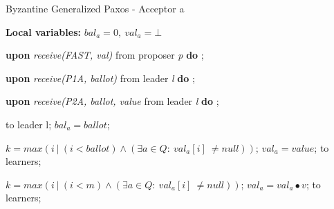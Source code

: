 \begin{algorithm}
\begin{algorithmic}[1]
		\iffalse \State
		\Function{proved\_safe}{Q, m}
		\State $k = max(i\ |\ (i < m) \wedge (\exists a \in Q :\ val_a[i]\ \neq null))$;
		\State $RS = \{R \in k$-$quorum\ |\ \forall a \in R \cap Q : val_a[k] \neq null\}$;
		\State $\gamma(R) = \sqcap \{v_a[k]\ |\ a \in Q \cap R \}$;
		\State $\Gamma = \{\gamma(R)\ |\ R \in RS \}$;
		\State
		\If{$RS = \varnothing$}
		\State \textbf{return} $\{val_a[k]\ |\ (a \in Q) \wedge (val_a[k] \neq null)\}$;
		\Else
		\State \textbf{return} $\sqcup \Gamma$;
		\EndIf
		\EndFunction
		\fi
		
	\end{algorithmic}
\end{algorithm}

\begin{algorithm}
	\caption{Byzantine Generalized Paxos - Acceptor a}
	\textbf{Local variables: } $bal_a = 0,\ val_a = \bot$ 
	\begin{algorithmic}[1]
		
		\State \textbf{upon} \textit{receive(FAST, val)} from proposer \textit{p} \textbf{do}
		\State \hspace{\algorithmicindent} ;
		
		\State
		\State \textbf{upon} \textit{receive(P1A, ballot)} from leader \textit{l} \textbf{do}
		\State \hspace{\algorithmicindent} ;
		
		\State
		\State \textbf{upon} \textit{receive(P2A, ballot, value} from leader \textit{l} \textbf{do}
		\State \hspace{\algorithmicindent} ; 
		
		\State
		\State {} to leader l;
		\State $bal_a = ballot$;
		\EndIf
		\EndFunction
	
		\State
		\State $k = max(i\ |\ (i < ballot) \wedge (\exists a \in Q :\ val_a[i]\ \neq null))$;
		\State $val_a = value$;
		\State {} to learners;
		\EndIf
		\EndFunction
		
		\State
		\State $k = max(i\ |\ (i < m) \wedge (\exists a \in Q :\ val_a[i]\ \neq null))$;
		\State $val_a = val_a \bullet v$;
		\State {} to learners;
		\EndIf
		\EndFunction
	\end{algorithmic}
\end{algorithm}

